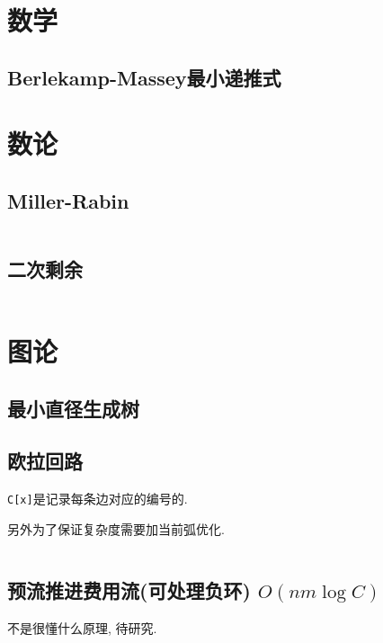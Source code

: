 \documentclass[a4paper]{article}
\begin{document}
	\begin{multicols}{2}
		\section{数学}
			\subsection{Berlekamp-Massey最小递推式}
				
		
		\section{数论}

			\subsection{Miller-Rabin}
				\inputminted{cpp}{../src/numbertheory/Miller-Rabin.cpp}
			
			\subsection{二次剩余}
				\inputminted{cpp}{../src/numbertheory/二次剩余.cpp}
				
		\section{图论}
			\subsection{最小直径生成树}
					
			
			\subsection{欧拉回路}
				\texttt{C[x]}是记录每条边对应的编号的.
				
				另外为了保证复杂度需要加当前弧优化.
				
				\inputminted{cpp}{../src/graph/欧拉回路.cpp}
			
			\subsection{预流推进费用流(可处理负环) $O(nm \log C)$}
				不是很懂什么原理, 待研究.

				\inputminted{cpp}{../src/graph/预流推进费用流.cpp}


\end{multicols}
\end{document}
